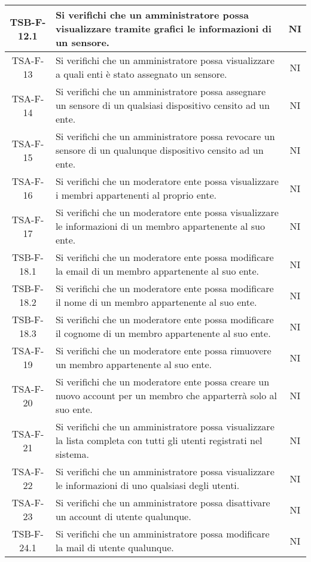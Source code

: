 \begin{center}
\begin{longtable}{|c|p{10cm}|c|}
			 \hline
			 TSB-F-12.1 & Si verifichi che un amministratore possa visualizzare tramite grafici le informazioni di un sensore. & NI \\
			 \hline
			 TSA-F-13 & Si verifichi che un amministratore possa visualizzare a quali enti è stato assegnato un sensore. & NI \\
			 \hline
			 TSA-F-14 & Si verifichi che un amministratore possa assegnare un sensore di un qualsiasi dispositivo censito ad un ente. & NI \\
			 \hline
			 TSA-F-15 & Si verifichi che un amministratore possa revocare un sensore di un qualunque dispositivo censito ad un ente. & NI \\
			 \hline
			 TSA-F-16 &  Si verifichi che un moderatore ente possa visualizzare i membri appartenenti al proprio ente. & NI \\
			 \hline
			 TSA-F-17 & Si verifichi che un moderatore ente possa visualizzare le informazioni di un membro appartenente al suo ente. & NI \\
			 \hline
			 TSB-F-18.1 & Si verifichi che un moderatore ente possa modificare la email di un membro appartenente al suo ente. & NI \\
			 \hline
			 TSB-F-18.2 & Si verifichi che un moderatore ente possa modificare il nome di un membro appartenente al suo ente. & NI \\
			 \hline
			 TSB-F-18.3 & Si verifichi che un moderatore ente possa modificare il cognome di un membro appartenente al suo ente. & NI \\
			 \hline
			 TSA-F-19 & Si verifichi che un moderatore ente possa rimuovere un membro appartenente al suo ente. & NI \\
			 \hline
			 TSA-F-20 & Si verifichi che un moderatore ente possa creare un nuovo account per un membro che apparterrà solo al suo ente. & NI \\
			 \hline
			 TSA-F-21 & Si verifichi che un amministratore possa visualizzare la lista completa con tutti gli utenti registrati nel sistema. & NI \\
			 \hline
			 TSA-F-22 & Si verifichi che un amministratore possa visualizzare le informazioni di uno qualsiasi degli utenti. & NI \\
			 \hline
			 TSA-F-23 & Si verifichi che un amministratore possa disattivare un account di utente qualunque. & NI \\
			 \hline
			 TSB-F-24.1 & Si verifichi che un amministratore possa modificare la mail di utente qualunque. & NI \\

\end{longtable}
\end{center}
